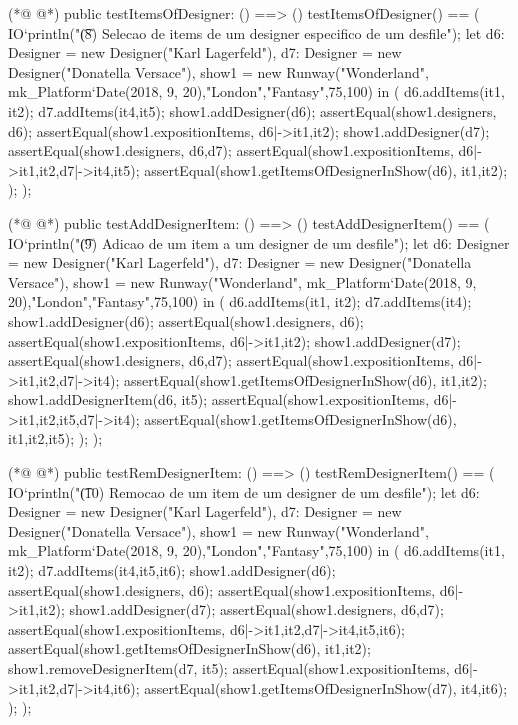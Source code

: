 \begin{vdmpp}[breaklines=true]
(*@
\label{testItemsOfDesigner:125}
@*)
 public testItemsOfDesigner: () ==> ()
 testItemsOfDesigner() == (
  IO`println("\t (8) Selecao de items de um designer especifico de um desfile");
  let d6: Designer = new Designer("Karl Lagerfeld"),
    d7: Designer = new Designer("Donatella Versace"),
  show1 = new Runway("Wonderland", mk_Platform`Date(2018, 9, 20),"London","Fantasy",75,100) in (
    d6.addItems({it1, it2});
    d7.addItems({it4,it5});
    show1.addDesigner(d6);
    assertEqual(show1.designers, {d6});
    assertEqual(show1.expositionItems, {d6|->{it1,it2}});
    show1.addDesigner(d7);
    assertEqual(show1.designers, {d6,d7});
    assertEqual(show1.expositionItems, {d6|->{it1,it2},d7|->{it4,it5}});
    assertEqual(show1.getItemsOfDesignerInShow(d6), {it1,it2});
  );
 );
 
(*@
\label{testAddDesignerItem:143}
@*)
 public testAddDesignerItem: () ==> ()
 testAddDesignerItem() == (
  IO`println("\t (9) Adicao de um item a um designer de um desfile");
  let d6: Designer = new Designer("Karl Lagerfeld"),
    d7: Designer = new Designer("Donatella Versace"),
  show1 = new Runway("Wonderland", mk_Platform`Date(2018, 9, 20),"London","Fantasy",75,100) in (
    d6.addItems({it1, it2});
    d7.addItems({it4});
    show1.addDesigner(d6);
    assertEqual(show1.designers, {d6});
    assertEqual(show1.expositionItems, {d6|->{it1,it2}});
    show1.addDesigner(d7);
    assertEqual(show1.designers, {d6,d7});
    assertEqual(show1.expositionItems, {d6|->{it1,it2},d7|->{it4}});
    assertEqual(show1.getItemsOfDesignerInShow(d6), {it1,it2});
    show1.addDesignerItem(d6, it5);
    assertEqual(show1.expositionItems, {d6|->{it1,it2,it5},d7|->{it4}});
    assertEqual(show1.getItemsOfDesignerInShow(d6), {it1,it2,it5});
  );
 );
 
(*@
\label{testRemDesignerItem:164}
@*)
 public testRemDesignerItem: () ==> ()
 testRemDesignerItem() == (
  IO`println("\t (10) Remocao de um item de um designer de um desfile");
  let d6: Designer = new Designer("Karl Lagerfeld"),
    d7: Designer = new Designer("Donatella Versace"),
  show1 = new Runway("Wonderland", mk_Platform`Date(2018, 9, 20),"London","Fantasy",75,100) in (
    d6.addItems({it1, it2});
    d7.addItems({it4,it5,it6});
    show1.addDesigner(d6);
    assertEqual(show1.designers, {d6});
    assertEqual(show1.expositionItems, {d6|->{it1,it2}});
    show1.addDesigner(d7);
    assertEqual(show1.designers, {d6,d7});
    assertEqual(show1.expositionItems, {d6|->{it1,it2},d7|->{it4,it5,it6}});
    assertEqual(show1.getItemsOfDesignerInShow(d6), {it1,it2});
    show1.removeDesignerItem(d7, it5);
    assertEqual(show1.expositionItems, {d6|->{it1,it2},d7|->{it4,it6}});
    assertEqual(show1.getItemsOfDesignerInShow(d7), {it4,it6});
  );
 );
 

\end{vdmpp}
